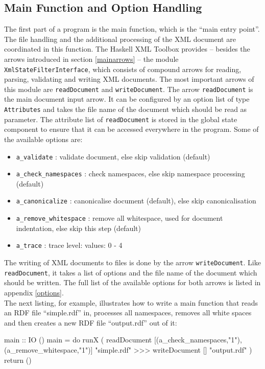 \documentclass[11pt,a4paper,headsepline, bibtotoc]{scrreprt}
\begin{document}
\subsection{Main Function and Option Handling}
The first part of a program is the main function, which is the ``main entry point''. The file handling and the additional processing of the XML document are coordinated in this function.    
The Haskell XML Toolbox provides -- besides the arrows introduced in section \ref{mainarrows} -- the module \texttt{XmlStateFilterInterface}, which consists of compound arrows for reading, parsing, validating and writing XML documents. The most important arrows of this module are \texttt{readDocument} and \texttt{writeDocument}. The arrow \texttt{readDocument} is the main document input arrow. It can be configured by an option list of type \texttt{Attributes} and takes the file name of the document which should be read as parameter. The attribute list of \texttt{readDocument} is stored in the global state component to ensure that it can be accessed everywhere in the program. Some of the available options are:
\begin{itemize}
  \item \texttt{a\_validate} : validate document, else skip validation (default)
  \item \texttt{a\_check\_namespaces} : check namespaces, else skip namespace processing (default)
  \item \texttt{a\_canonicalize} : canonicalise document (default), else skip canonicalisation
  \item \texttt{a\_remove\_whitespace} : remove all whitespace, used for document indentation, else skip this step (default)
  \item \texttt{a\_trace} : trace level: values: 0 - 4
\end{itemize}
The writing of XML documents to files is done by the arrow \texttt{writeDocument}. Like \texttt{readDocument}, it takes a list of options and the file name of the document which should be written. The full list of the available options for both arrows is listed in appendix \ref{options}.\\
The next listing, for example, illustrates how to write a main function that reads an RDF file ``simple.rdf'' in, processes all namespaces, removes all white spaces and then creates a new RDF file ``output.rdf'' out of it:
\begin{code}[caption=First Main Function]
main :: IO ()
main
  = do
    runX ( readDocument [(a_check_namespaces,"1"),
                         (a_remove_whitespace,"1")] 
                        "simple.rdf"
           >>>
           writeDocument [] "output.rdf"
         )
    return ()
\end{code}
\end{document}
